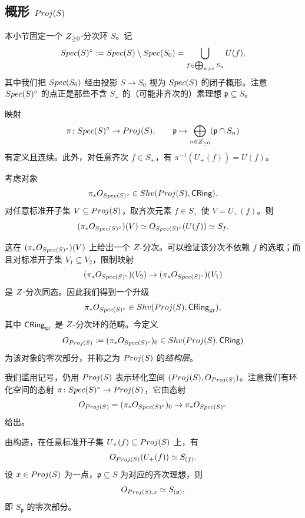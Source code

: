 \subsection{概形 $Proj(S)$}\label{sec:25.2}

本小节固定一个 $Z_{\ge 0}$-分次环 $S$。记
\[
Spec(S)^{\circ} := Spec(S) \setminus Spec(S_0) = \bigcup_{f \in \bigoplus_{n>0} S_n} U(f),
\]
其中我们把 $Spec(S_0)$ 经由投影 $S \to S_0$ 视为 $Spec(S)$ 的闭子概形。注意 $Spec(S)^{\circ}$ 的点正是那些不含 $S_+$ 的（可能非齐次的）素理想 $\mathfrak p \subseteq S$。

\begin{exercise}\label{exc:25.2.1}
映射
\[
\pi \colon Spec(S)^{\circ} \to Proj(S), \qquad \mathfrak p \mapsto \bigoplus_{n \in Z_{\ge 0}} (\mathfrak p \cap S_n)
\]
有定义且连续。此外，对任意齐次 $f \in S_+$，有 $\pi^{-1}(U_+(f)) = U(f)$。
\end{exercise}

\begin{construction}\label{con:25.2.2}
考虑对象
\[
\pi_* O_{Spec(S)^{\circ}} \in Shv(Proj(S), \mathsf{CRing}).
\]
对任意标准开子集 $V \subseteq Proj(S)$，取齐次元素 $f \in S_+$ 使 $V = U_+(f)$。则
\[
(\pi_* O_{Spec(S)^{\circ}})(V) \simeq O_{Spec(S)^{\circ}}(U(f)) \simeq S_f.
\]
\end{construction}

这在 $(\pi_* O_{Spec(S)^{\circ}})(V)$ 上给出一个 $Z$-分次。可以验证该分次不依赖 $f$ 的选取；而且对标准开子集 $V_1 \subseteq V_2$，限制映射
\[
(\pi_* O_{Spec(S)^{\circ}})(V_2) \to (\pi_* O_{Spec(S)^{\circ}})(V_1)
\]
是 $Z$-分次同态。因此我们得到一个升级
\[
\pi_* O_{Spec(S)^{\circ}} \in Shv(Proj(S), \mathsf{CRing}_{\mathrm{gr}}),
\]
其中 $\mathsf{CRing}_{\mathrm{gr}}$ 是 $Z$-分次环的范畴。今定义
\[
O_{Proj(S)} := (\pi_* O_{Spec(S)^{\circ}})_0 \in Shv(Proj(S), \mathsf{CRing})
\]
为该对象的零次部分，并称之为 $Proj(S)$ 的\emph{结构层}。

我们滥用记号，仍用 $Proj(S)$ 表示环化空间 $(Proj(S), O_{Proj(S)})$。注意我们有环化空间的态射 $\pi \colon Spec(S)^{\circ} \to Proj(S)$，它由态射
\[
O_{Proj(S)} = (\pi_* O_{Spec(S)^{\circ}})_0 \to \pi_* O_{Spec(S)^{\circ}}
\]
给出。

\begin{remark}\label{rem:25.2.3}
由构造，在任意标准开子集 $U_+(f) \subseteq Proj(S)$ 上，有
\[
O_{Proj(S)}(U_+(f)) \simeq S_{(f)}.
\]
设 $x \in Proj(S)$ 为一点，$\mathfrak p \subseteq S$ 为对应的齐次理想，则
\[
O_{Proj(S), x} \simeq S_{(\mathfrak p)},
\]
即 $S_{\mathfrak p}$ 的零次部分。
\end{remark}

